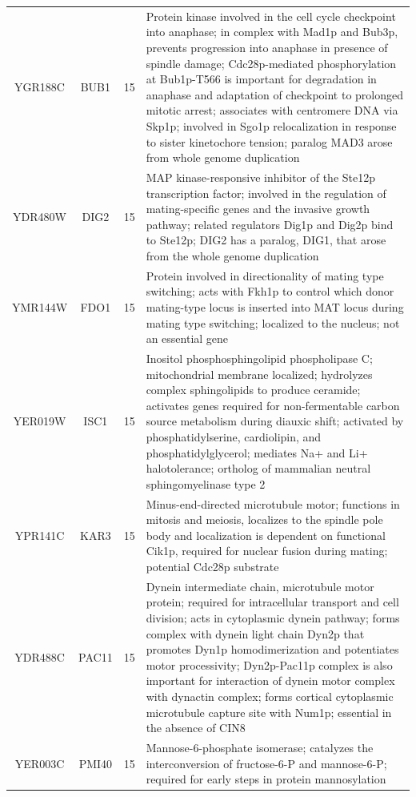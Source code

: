 \documentclass[]{article}
\begin{document}
\begin{longtable}{@{\extracolsep{3pt}} cccp{85mm}}
YGR188C & BUB1 & 15 & Protein kinase involved in the cell cycle checkpoint into anaphase; in complex with Mad1p and Bub3p, prevents progression into anaphase in presence of spindle damage; Cdc28p-mediated phosphorylation at Bub1p-T566 is important for degradation in anaphase and adaptation of checkpoint to prolonged mitotic arrest; associates with centromere DNA via Skp1p; involved in Sgo1p relocalization in response to sister kinetochore tension; paralog MAD3 arose from whole genome duplication \\ 
YDR480W & DIG2 & 15 & MAP kinase-responsive inhibitor of the Ste12p transcription factor; involved in the regulation of mating-specific genes and the invasive growth pathway; related regulators Dig1p and Dig2p bind to Ste12p; DIG2 has a paralog, DIG1, that arose from the whole genome duplication \\ 
YMR144W & FDO1 & 15 & Protein involved in directionality of mating type switching; acts with Fkh1p to control which donor mating-type locus is inserted into MAT locus during mating type switching; localized to the nucleus; not an essential gene \\ 
YER019W & ISC1 & 15 & Inositol phosphosphingolipid phospholipase C; mitochondrial membrane localized; hydrolyzes complex sphingolipids to produce ceramide; activates genes required for non-fermentable carbon source metabolism during diauxic shift; activated by phosphatidylserine, cardiolipin, and phosphatidylglycerol; mediates Na+ and Li+ halotolerance; ortholog of mammalian neutral sphingomyelinase type 2 \\ 
YPR141C & KAR3 & 15 & Minus-end-directed microtubule motor; functions in mitosis and meiosis, localizes to the spindle pole body and localization is dependent on functional Cik1p, required for nuclear fusion during mating; potential Cdc28p substrate \\ 
YDR488C & PAC11 & 15 & Dynein intermediate chain, microtubule motor protein; required for intracellular transport and cell division; acts in cytoplasmic dynein pathway; forms complex with dynein light chain Dyn2p that promotes Dyn1p homodimerization and potentiates motor processivity; Dyn2p-Pac11p complex is also important for interaction of dynein motor complex with dynactin complex; forms cortical cytoplasmic microtubule capture site with Num1p; essential in the absence of CIN8 \\ 
YER003C & PMI40 & 15 & Mannose-6-phosphate isomerase; catalyzes the interconversion of fructose-6-P and mannose-6-P; required for early steps in protein mannosylation \\ 

\end{longtable}
\end{document}
